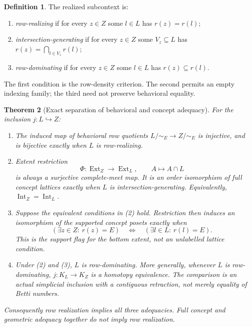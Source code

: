\documentclass[11pt]{article}
\newtheorem{theorem}{Theorem}[section]
\theoremstyle{definition}
\newtheorem{definition}[theorem]{Definition}
\theoremstyle{remark}\newtheorem{remark}[theorem]{Remark}
\newcommand{\Ext}{\operatorname{Ext}}
\newcommand{\Int}{\operatorname{Int}}
\begin{document}
\begin{definition}
The realized subcontext is:
\begin{enumerate}
\item \emph{row-realizing} if for every $z\in Z$ some $l\in L$ has
$r(z)=r(l)$;
\item \emph{intersection-generating} if for every $z\in Z$ some
$V_z\subseteq L$ has $r(z)=\bigcap_{l\in V_z}r(l)$;
\item \emph{row-dominating} if for every $z\in Z$ some $l\in L$ has
$r(z)\subseteq r(l)$.
\end{enumerate}
The first condition is the row-density criterion. The second permits an
empty indexing family; the third need not preserve behavioral equality.
\end{definition}

\begin{theorem}[Exact separation of behavioral and concept adequacy]
\label{v:thm:three}
For the inclusion $j:L\hookrightarrow Z$:
\begin{enumerate}
\item The induced map of behavioral row quotients $L/{\sim_E}\to
Z/{\sim_E}$ is injective, and is bijective exactly when $L$ is
row-realizing.
\item Extent restriction
\[
 \Phi:\Ext_Z\longrightarrow\Ext_L,
 \qquad A\longmapsto A\cap L
\]
is always a surjective complete-meet map. It is an order isomorphism
of full concept lattices exactly when $L$ is intersection-generating.
Equivalently, $\Int_Z=\Int_L$.
\item Suppose the equivalent conditions in (2) hold. Restriction then
induces an isomorphism of the \emph{supported} concept posets exactly when
\begin{equation}
 (\exists z\in Z:\ r(z)=E)
 \quad\Longleftrightarrow\quad
 (\exists l\in L:\ r(l)=E).
 \label{v:eq:universal-object}
\end{equation}
This is the support flag for the bottom extent, not an unlabelled
lattice condition.
\item Under (2) and (3), $L$ is row-dominating. More generally, whenever
$L$ is row-dominating, $j:K_L\to K_Z$ is a homotopy equivalence. The
comparison is an actual simplicial inclusion with a contiguous
retraction, not merely equality of Betti numbers.
\end{enumerate}
Consequently row realization implies all three adequacies. Full concept
and geometric adequacy together do not imply row realization.
\end{theorem}
\end{document}
